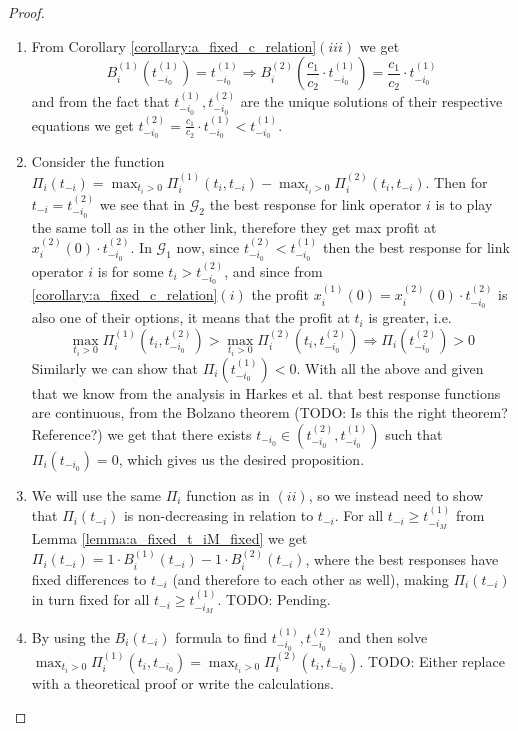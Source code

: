 \documentclass[10pt,a4paper]{book}
\newcommand{\Gm}{\mathcal{G}}
\theoremstyle{definition}
\theoremstyle{comment}
\begin{document}
\begin{proof}
	$ $
	\begin{enumerate}[$(i)$]
		\item From Corollary \ref{corollary:a_fixed_c_relation}$(iii)$ we get
		\[
			B_i^{(1)}(t_{-i_0}^{(1)}) = t_{-i_0}^{(1)} \Rightarrow B_i^{(2)}\left(\frac{c_1}{c_2} \cdot t_{-i_0}^{(1)}\right) = \frac{c_1}{c_2} \cdot t_{-i_0}^{(1)}
		\]
		and from the fact that $t_{-i_0}^{(1)}, t_{-i_0}^{(2)}$ are the unique solutions of their respective equations we get $t_{-i_0}^{(2)} = \frac{c_1}{c_2} \cdot t_{-i_0}^{(1)} < t_{-i_0}^{(1)}$.
		\item Consider the function $\Pi_i(t_{-i}) = \max_{t_i > 0}\Pi_i^{(1)}(t_i, t_{-i}) - \max_{t_i > 0}\Pi_i^{(2)}(t_i, t_{-i})$.
		Then for $t_{-i} = t_{-i_0}^{(2)}$ we see that in $\Gm_2$ the best response for link operator $i$ is to play the same toll as in the other link, therefore they get max profit at $x_i^{(2)}(0) \cdot t_{-i_0}^{(2)}$.
		In $\Gm_1$ now, since $t_{-i_0}^{(2)} < t_{-i_0}^{(1)}$ then the best response for link operator $i$ is for some $t_i > t_{-i_0}^{(2)}$, and since from \ref{corollary:a_fixed_c_relation}$(i)$ the profit $x_i^{(1)}(0) = x_i^{(2)}(0) \cdot t_{-i_0}^{(2)}$ is also one of their options, it means that the profit at $t_i$ is greater, i.e.
		\[
			\max_{t_i > 0}\Pi_i^{(1)}(t_i, t_{-i_0}^{(2)}) > \max_{t_i > 0}\Pi_i^{(2)}(t_i, t_{-i_0}^{(2)}) \Rightarrow \Pi_i(t_{-i_0}^{(2)}) > 0
		\]
		Similarly we can show that $\Pi_i(t_{-i_0}^{(1)}) < 0$.
		With all the above and given that we know from the analysis in Harkes et al. \cite{Harks_2019} that best response functions are continuous, from the Bolzano theorem (TODO: Is this the right theorem? Reference?) we get that there exists $t_{-i_0} \in \left(t_{-i_0}^{(2)}, t_{-i_0}^{(1)}\right)$ such that $\Pi_i(t_{-i_0}) = 0$, which gives us the desired proposition.
		\item We will use the same $\Pi_i$ function as in $(ii)$, so we instead need to show that $\Pi_i(t_{-i})$ is non-decreasing in relation to $t_{-i}$.
		For all $t_{-i} \ge t_{-i_M}^{(1)}$ from Lemma \ref{lemma:a_fixed_t_iM_fixed} we get $\Pi_i(t_{-i}) = 1 \cdot B_i^{(1)}(t_{-i}) - 1 \cdot B_i^{(2)}(t_{-i})$, where the best responses have fixed differences to $t_{-i}$ (and therefore to each other as well), making $\Pi_i(t_{-i})$ in turn fixed for all $t_{-i} \ge t_{-i_M}^{(1)}$.
		TODO: Pending.
		\item By using the $B_i(t_{-i})$ formula to find $t_{-i_0}^{(1)}, t_{-i_0}^{(2)}$ and then solve $\max_{t_i > 0}\Pi_i^{(1)}(t_i, t_{-i_0}) = \max_{t_i > 0}\Pi_i^{(2)}(t_i, t_{-i_0})$.
		TODO: Either replace with a theoretical proof or write the calculations.
	\end{enumerate}
\end{proof}
\end{document}
